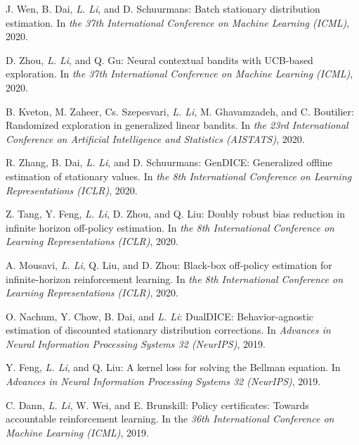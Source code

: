 \documentclass[10pt,twoside,letterpaper]{article}
\newcommand{\selffont}[1]{{\textit{#1}}}
\newcommand{\venuefont}[1]{{\textit{#1}}}
\newcommand{\myself}{\selffont{L. Li}}
\begin{document}
\begin{compactenum}[(C1)]

\item{J. Wen, B. Dai, \myself, and D. Schuurmans: Batch stationary distribution estimation.  In \venuefont{the 37th International Conference on Machine Learning (ICML)}, 2020.}

\item{D. Zhou, \myself, and Q. Gu: Neural contextual bandits with UCB-based exploration.  In \venuefont{the 37th International Conference on Machine Learning (ICML)}, 2020.}

\item{B. Kveton, M. Zaheer, Cs. Szepesvari, \myself, M. Ghavamzadeh, and C. Boutilier: Randomized exploration in generalized linear bandits.  In \venuefont{the 23rd International Conference on Artificial Intelligence and Statistics (AISTATS)}, 2020.}

\item{R. Zhang, B. Dai, \myself, and D. Schuurmans: GenDICE: Generalized offline estimation of stationary values.  In \venuefont{the 8th International Conference on Learning Representations (ICLR)}, 2020.}

\item{Z. Tang, Y. Feng, \myself, D. Zhou, and Q. Liu: Doubly robust bias reduction in infinite horizon off-policy estimation.  In \venuefont{the 8th International Conference on Learning Representations (ICLR)}, 2020.}

\item{A. Mousavi, \myself, Q. Liu, and D. Zhou: Black-box off-policy estimation for infinite-horizon reinforcement learning.  In \venuefont{the 8th International Conference on Learning Representations (ICLR)}, 2020.}

\item{O. Nachum, Y. Chow, B. Dai, and \myself: DualDICE: Behavior-agnostic estimation of discounted stationary distribution corrections. In \venuefont{Advances in Neural Information Processing Systems 32 (NeurIPS)}, 2019.}

\item{Y. Feng, \myself, and Q. Liu: A kernel loss for solving the Bellman equation. In \venuefont{Advances in Neural Information Processing Systems 32 (NeurIPS)}, 2019.}

\item{C. Dann, \myself, W. Wei, and E. Brunskill: Policy certificates: Towards accountable reinforcement learning. In the \venuefont{36th International Conference on Machine Learning (ICML)}, 2019.}


\end{compactenum}
\end{document}
